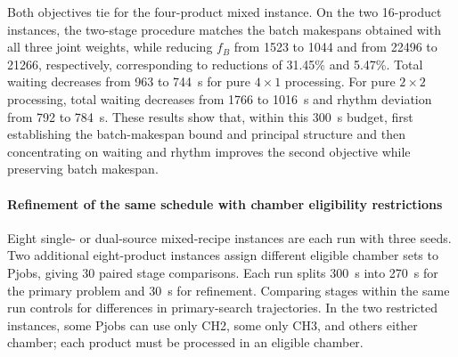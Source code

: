 \documentclass[final,5p,times,twocolumn]{elsarticle}
\begin{document}
Both objectives tie for the four-product mixed instance. On the two 16-product instances, the two-stage procedure matches the batch makespans obtained with all three joint weights, while reducing $f_B$ from 1523 to 1044 and from 22496 to 21266, respectively, corresponding to reductions of 31.45\% and 5.47\%. Total waiting decreases from 963 to 744~s for pure $4\times1$ processing. For pure $2\times2$ processing, total waiting decreases from 1766 to 1016~s and rhythm deviation from 792 to 784~s. These results show that, within this 300~s budget, first establishing the batch-makespan bound and principal structure and then concentrating on waiting and rhythm improves the second objective while preserving batch makespan.

\paragraph{Refinement of the same schedule with chamber eligibility restrictions}
Eight single- or dual-source mixed-recipe instances are each run with three seeds. Two additional eight-product instances assign different eligible chamber sets to Pjobs, giving 30 paired stage comparisons. Each run splits 300~s into 270~s for the primary problem and 30~s for refinement. Comparing stages within the same run controls for differences in primary-search trajectories. In the two restricted instances, some Pjobs can use only CH2, some only CH3, and others either chamber; each product must be processed in an eligible chamber.


\begin{table}[!htbp]
\centering\small
\caption{Timing refinement of the same schedule (three-seed means, s)}
\label{tab:refinement-ablation-cn}
\end{table}
\end{document}
